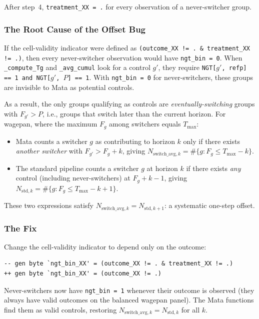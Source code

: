 \documentclass[11pt]{article}
\begin{document}
After step~4, \texttt{treatment\_XX = .} for every observation of a
never-switcher group.

\subsubsection{The Root Cause of the Offset Bug}

If the cell-validity indicator were defined as
\texttt{(outcome\_XX != .\ \&\ treatment\_XX != .)}, then every
never-switcher observation would have \texttt{ngt\_bin = 0}. When
\texttt{\_compute\_Tg} and \texttt{\_avg\_cumul} look for a control $g'$,
they require \texttt{NGT[$g'$, refp] == 1 and NGT[$g'$, $P$] == 1}. With
\texttt{ngt\_bin = 0} for never-switchers, these groups are invisible to Mata
as potential controls.

As a result, the only groups qualifying as controls are \emph{eventually-switching}
groups with $F_{g'} > P$, i.e., groups that switch later than the current
horizon. For wagepan, where the maximum $F_g$ among switchers equals $T_{\max}$:
\begin{itemize}[nosep]
  \item Mata counts a switcher $g$ as contributing to horizon $k$ only if
        there exists \emph{another switcher} with $F_{g'} > F_g + k$, giving
        $N_{\text{switch\_avg},k} = \#\{g : F_g \leq T_{\max} - k\}$.
  \item The standard pipeline counts a switcher $g$ at horizon $k$ if there
        exists \emph{any} control (including never-switchers) at $F_g + k - 1$,
        giving $N_{\text{std},k} = \#\{g : F_g \leq T_{\max} - k + 1\}$.
\end{itemize}

These two expressions satisfy $N_{\text{switch\_avg},k} = N_{\text{std},k+1}$:
a systematic one-step offset.

\subsubsection{The Fix}

Change the cell-validity indicator to depend only on the outcome:

\begin{lstlisting}[language={}]
-- gen byte `ngt_bin_XX' = (outcome_XX != . & treatment_XX != .)
++ gen byte `ngt_bin_XX' = (outcome_XX != .)
\end{lstlisting}

Never-switchers now have \texttt{ngt\_bin = 1} whenever their outcome is
observed (they always have valid outcomes on the balanced wagepan panel). The
Mata functions find them as valid controls, restoring
$N_{\text{switch\_avg},k} = N_{\text{std},k}$ for all $k$.
\end{document}
